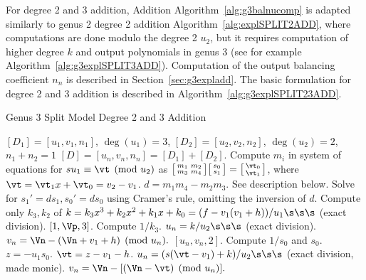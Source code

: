 For degree 2 and 3 addition, Addition Algorithm~\ref{alg:g3balnucomp} is adapted
similarly to genus 2 degree 2 addition
Algorithm~\ref{alg:explSPLIT2ADD}, where computations are done modulo the degree
2 $u_2$, but it requires computation of higher degree $k$ and output polynomials in
genus 3 (see for example Algorithm~\ref{alg:g3explSPLIT3ADD}). Computation of
the output balancing coefficient $n_n$ is described in Section~\ref{sec:g3expladd}.
The basic formulation for degree 2 and 3 addition is described in
Algorithm~\ref{alg:g3explSPLIT23ADD}.

\begin{algorithm}[htbp]
\caption{Genus 3 Split Model Degree 2 and 3 Addition\label{alg:g3explSPLIT23ADD}}
\begin{algorithmic} [1]
\Require $[D_1] = [u_1,v_1,n_1]$, $\deg(u_1) = 3$, $[D_2] = [u_2,v_2,n_2]$, $\deg(u_2) = 2$, $n_1 + n_2 = 1$
\Ensure $[D] = [u_n,v_n,n_n] = [D_1] + [D_2] $.
\algrule
\vspace{-2pt}
\State Compute $m_i$ in system of equations for $su_1\equiv \vt \pmod{u_2}$ as $ \bigl[ \begin{smallmatrix} m_1 & m_2\\ m_3 & m_4\end{smallmatrix}\bigr] \bigl[ \begin{smallmatrix} s_0\\ s_1 \end{smallmatrix} \bigr ] = \bigl[ \begin{smallmatrix}\vt_0 \\  \vt_1\end{smallmatrix} \bigr ]$, where $\vt = \vt_1x + \vt_0 = v_2 - v_1$.
\State $d = m_1m_4 - m_2m_3$.
    \State See description below.
\EndIf
\State Solve for $s_1' = ds_1, s_0' = ds_0$ using Cramer's rule, omitting the inversion of $d$.
\State Compute only $k_3, k_2$ of $k = k_3x^3 + k_2x^2 + k_1x + k_0 = (f - v_1(v_1 + h))/u_1 \s\s\s$ (exact division).  
         \Return $[1,\Vp,3]$.
        \Else \hspace{3pt} Compute $1/k_3$.
            \State $u_n = k/u_2 \s\s\s$ (exact division).
            \State $v_n = \Vn - (\Vn + v_1 + h) \pmod{u_n}.$
            \State \Return $[u_n,v_n,2]$.
        \EndIf
    \Else \hspace{3pt} Compute $1/s_0$ and $s_0$.
        \State $z = -u_1s_0$.
        \State $\vt = z - v_1 - h$.
        \State $u_n = (s(\vt - v_1) + k)/u_2 \s\s\s$ (exact division, made monic).
        \State $v_n = \Vn - [(\Vn - \vt) \pmod{u_n}].$

\end{algorithmic}
\end{algorithm}
